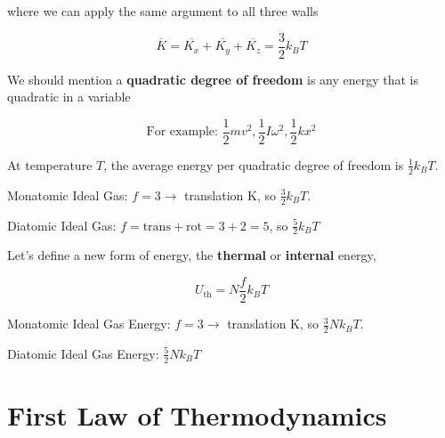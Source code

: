 where we can apply the same argument to all three walls

\begin{equation}
	\overline{K} = \overline{K_x} + \overline{K_y} + \overline{K_z} = \frac{3}{2} k_B T
\end{equation}

We should mention a \textbf{quadratic degree of freedom} is any energy that is quadratic in a variable

\begin{equation}
	\text{For example: } \frac{1}{2}mv^2, \frac{1}{2} I \omega^2, \frac{1}{2}kx^2
\end{equation}

\begin{theorem}
	At temperature $T$, the average energy per quadratic degree of freedom is $\frac{1}{2}k_B T$.
\end{theorem}

Monatomic Ideal Gas: $f = 3 \to$ translation K, so $\frac{3}{2}k_BT$.

Diatomic Ideal Gas: $f = \text{trans} + \text{rot} = 3 + 2 = 5$, so $\frac{5}{2}k_BT$

Let's define a new form of energy, the \textbf{thermal} or \textbf{internal} energy,

\begin{equation}
	U_\mathrm{th} = N \frac{f}{2} k_BT
\end{equation}

Monatomic Ideal Gas Energy: $f = 3 \to$ translation K, so $\frac{3}{2}Nk_BT$.

Diatomic Ideal Gas Energy: $\frac{5}{2}Nk_BT$

\section{First Law of Thermodynamics}

